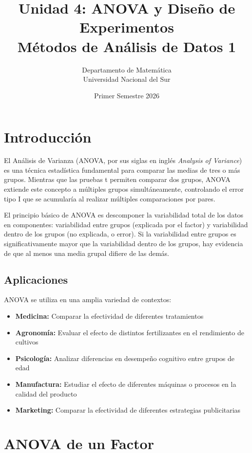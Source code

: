 \documentclass[11pt,a4paper]{article}
\title{\textbf{Unidad 4: ANOVA y Diseño de Experimentos} \\ 
\Large Métodos de Análisis de Datos 1}
\author{Departamento de Matemática \\ Universidad Nacional del Sur}
\date{Primer Semestre 2026}
\theoremstyle{definition}
\begin{document}
\maketitle

\tableofcontents
\newpage

\section{Introducción}

El Análisis de Varianza (ANOVA, por sus siglas en inglés \textit{Analysis of Variance}) es una técnica estadística fundamental para comparar las medias de tres o más grupos. Mientras que las pruebas t permiten comparar dos grupos, ANOVA extiende este concepto a múltiples grupos simultáneamente, controlando el error tipo I que se acumularía al realizar múltiples comparaciones por pares.

El principio básico de ANOVA es descomponer la variabilidad total de los datos en componentes: variabilidad entre grupos (explicada por el factor) y variabilidad dentro de los grupos (no explicada, o error). Si la variabilidad entre grupos es significativamente mayor que la variabilidad dentro de los grupos, hay evidencia de que al menos una media grupal difiere de las demás.

\subsection{Aplicaciones}

ANOVA se utiliza en una amplia variedad de contextos:

\begin{itemize}
    \item \textbf{Medicina:} Comparar la efectividad de diferentes tratamientos
    \item \textbf{Agronomía:} Evaluar el efecto de distintos fertilizantes en el rendimiento de cultivos
    \item \textbf{Psicología:} Analizar diferencias en desempeño cognitivo entre grupos de edad
    \item \textbf{Manufactura:} Estudiar el efecto de diferentes máquinas o procesos en la calidad del producto
    \item \textbf{Marketing:} Comparar la efectividad de diferentes estrategias publicitarias
\end{itemize}

\section{ANOVA de un Factor}
\end{document}

